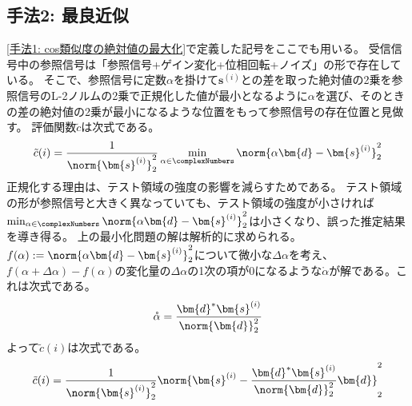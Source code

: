             \subsection{手法2: 最良近似}
                \ref{手法1: cos類似度の絶対値の最大化}で定義した記号をここでも用いる。
                受信信号中の参照信号は「参照信号+ゲイン変化+位相回転+ノイズ」の形で存在している。
                そこで、参照信号に定数$\alpha$を掛けて$\bm{s}^{(i)}$との差を取った絶対値の2乗を参照信号のL-2ノルムの2乗で正規化した値が最小となるように$\alpha$を選び、そのときの差の絶対値の2乗が最小になるような位置をもって参照信号の存在位置と見做す。
                評価関数$\tilde{c}$は次式である。
                \[ \tilde{c}(i) = \frac{1}{\norm{\bm{s}^{(i)}}_2^2}\min_{\alpha \in \complexNumbers}\norm{\alpha\bm{d} - \bm{s}^{(i)}}_2^2 \]
                正規化する理由は、テスト領域の強度の影響を減らすためである。
                テスト領域の形が参照信号と大きく異なっていても、テスト領域の強度が小さければ$\min_{\alpha \in \complexNumbers}\norm{\alpha\bm{d} - \bm{s}^{(i)}}_2^2$は小さくなり、誤った推定結果を導き得る。
                上の最小化問題の解は解析的に求められる。
                $f(\alpha) := \norm{\alpha\bm{d} - \bm{s}^{(i)}}_2^2$について微小な$\Delta\alpha$を考え、$f(\alpha+\Delta\alpha) - f(\alpha)$の変化量の$\Delta\alpha$の1次の項が0になるような$\mathring{\alpha}$が解である。これは次式である。
                \[
                    \mathring{\alpha} = \frac{\bm{d}^*\bm{s}^{(i)}}{\norm{\bm{d}}_2^2}
                \]
                よって$\tilde{c}(i)$は次式である。
                \[ \tilde{c}(i) = \frac{1}{\norm{\bm{s}^{(i)}}_2^2}\norm{\bm{s}^{(i)} - \frac{\bm{d}^*\bm{s}^{(i)}}{\norm{\bm{d}}_2^2}\bm{d}}_2^2 \]
